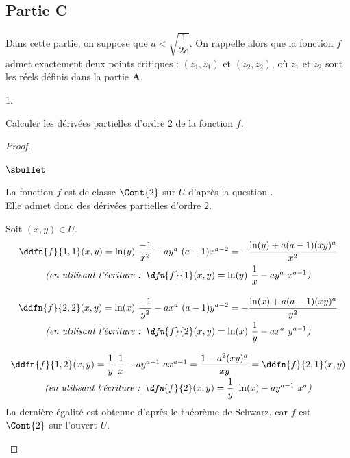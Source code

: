 \documentclass[11pt]{article}%
\begin{document}
\subsection*{Partie C}
\noindent
Dans cette partie, on suppose que $a<\sqrt{\dfrac{1}{2e}}$. On
rappelle alors que la fonction $f$ admet exactement deux points
critiques : $(z_1,z_1)$ et $(z_2,z_2)$, où $z_1$ et $z_2$ sont les
réels définis dans la partie {\bf A}.
\begin{noliste}{1.}
  \setcounter{enumi}{7}
\item Calculer les dérivées partielles d'ordre $2$ de la fonction $f$.
  
  \begin{proof}~
    \begin{noliste}{$\sbullet$}
    \item La fonction $f$ est de classe $\Cont{2}$ sur $U$ d'après la
      question .\\
      Elle admet donc des dérivées partielles d'ordre $2$.
  
    \item Soit $(x,y)\in U$.
      \[
      \begin{array}{c}
        \ddfn{f}{1,1}(x,y) = \ln(y) \ \dfrac{-1}{x^2} - ay^a \ (a-1)
        x^{a-2} = -\dfrac{\ln(y) + a(a-1)(xy)^a}{x^2}
        \\[.3cm]
        \text{\it (en utilisant l'écriture : $\dfn{f}{1}(x,y) = \ln(y) \
          \dfrac{1}{x} - a y^a \ x^{a-1}$)}
        \\[.6cm]
        \ddfn{f}{2,2}(x,y) = \ln(x) \ \dfrac{-1}{y^2} - ax^a \ (a-1)
        y^{a-2} = -\dfrac{\ln(x) + a(a-1)(xy)^a}{y^2}
        \\[.3cm]
        \text{\it (en utilisant l'écriture : $\dfn{f}{2}(x,y) = \ln(x) \
          \dfrac{1}{y} - a x^a \ y^{a-1}$)}
        \\[.6cm]
        \ddfn{f}{1,2}(x,y) = \dfrac{1}{y} \ \dfrac{1}{x} - a y^{a-1} \
        a x^{a-1} = \dfrac{1-a^2(xy)^{a}}{xy}=\ddfn{f}{2,1}(x,y)
        \\[.3cm]
        \text{\it (en utilisant l'écriture : $\dfn{f}{2}(x,y) =
          \dfrac{1}{y} \ \ln(x) - a y^{a-1} \ x^a$)}
      \end{array}
      \]
      La dernière égalité est obtenue d'après le théorème de Schwarz,
      car $f$ est $\Cont{2}$ sur l'ouvert $U$.%
      ~\\[-1.2cm]
    \end{noliste}
  \end{proof}
  

\end{noliste}
\end{document}
